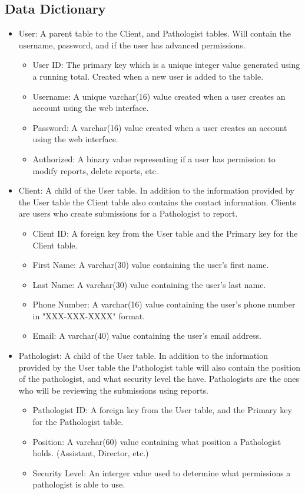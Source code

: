 \documentclass[onecolumn, draftclsnofoot,10pt, compsoc]{IEEEtran}
\begin{document}
\subsection{Data Dictionary}
\begin{itemize}
\item User:\newline
A parent table to the Client, and Pathologist tables. Will contain the username, password, and if the user has advanced permissions.
\begin{itemize}
\item User ID: The primary key which is a unique integer value generated using a running total. Created when a new user is added to the table.
\item Username: A unique varchar(16) value created when a user creates an account using the web interface.
\item Password: A varchar(16) value created when a user creates an account using the web interface.
\item Authorized: A binary value representing if a user has permission to modify reports, delete reports, etc.
\end{itemize}

\item Client:\newline
A child of the User table. In addition to the information provided by the User table the Client table also contains the contact information. Clients are users who create submissions for a Pathologist to report.
\begin{itemize}
\item Client ID: A foreign key from the User table and the Primary key for the Client table.
\item First Name: A varchar(30) value containing the user's first name.
\item Last Name: A varchar(30) value containing the user's last name.
\item Phone Number: A varchar(16) value containing the user's phone number in "XXX-XXX-XXXX" format.
\item Email: A varchar(40) value containing the user's email address.
\end{itemize}

\item Pathologist:\newline
A child of the User table. In addition to the information provided by the User table the Pathologist table will also contain the position of the pathologist, and what security level the have. Pathologists are the ones who will be reviewing the submissions using reports.
\begin{itemize}
\item Pathologist ID: A foreign key from the User table, and the Primary key for the Pathologist table.
\item Position: A varchar(60) value containing what position a Pathologist holds. (Assistant, Director, etc.)
\item Security Level: An interger value used to determine what permissions a pathologist is able to use.
\end{itemize}


\end{itemize}
\end{document}
